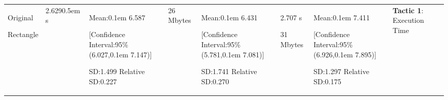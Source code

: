 {\begin{longtable}{|p{1.15cm}|p{1.3cm}|p{1.8cm}|p{1.5cm}|p{1.8cm}|p{1.8cm}|p{1.8cm}|p{2.5cm}|}
  
  \hline
   Original\par Rectangle & 
   2.629\kern0.5em s &
   Mean:\kern0.1em 6.587\par \vspace{.5em} [Confidence Interval:95\% (6.027,\kern0.1em 7.147)]\par \vspace{.5em} SD:1.499\vspace{.5em} Relative SD:0.227  &
   26 Mbytes &
   Mean:\kern0.1em 6.431\par \vspace{.5em} [Confidence Interval:95\% (5.781,\kern0.1em 7.081)]\par \vspace{.5em} SD:1.741\vspace{.5em} Relative SD:0.270 &
   2.707 s\par \vspace{.5em} 31 Mbytes &
   Mean:\kern0.1em 7.411\par \vspace{.5em} [Confidence Interval:95\% (6.926,\kern0.1em 7.895)]\par \vspace{.5em} SD:1.297\vspace{.5em} Relative SD:0.175 & 
   \textbf{Tactic 1}: Execution Time \\
   

\end{longtable}}

